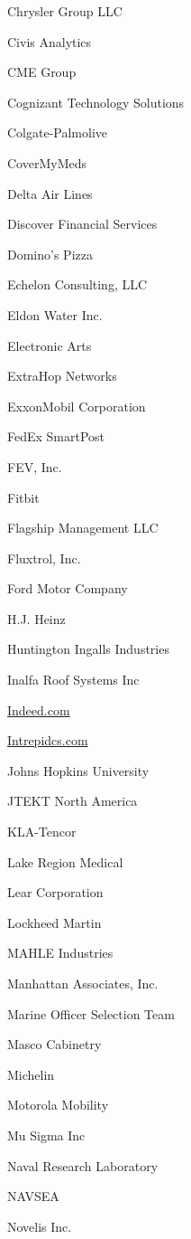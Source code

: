 \documentclass[twoside]{article}
\begin{document}
\begin{center}
\begin{multicols}{5}
\begin{FlushLeft}
\begin{compactitem}
\item Chrysler Group LLC
\item Civis Analytics
\item CME Group
\item Cognizant Technology Solutions
\item Colgate-Palmolive
\item CoverMyMeds
\item Delta Air Lines
\item Discover Financial Services
\item Domino's Pizza
\item Echelon Consulting, LLC
\item Eldon Water Inc.
\item Electronic Arts
\item ExtraHop Networks
\item ExxonMobil Corporation
\item FedEx SmartPost
\item FEV, Inc.
\item Fitbit
\item Flagship Management LLC
\item Fluxtrol, Inc.
\item Ford Motor Company
\item H.J. Heinz
\item Huntington Ingalls Industries
\item Inalfa Roof Systems Inc
\item \url{Indeed.com}
\item \url{Intrepidcs.com}
\item Johns Hopkins University
\item JTEKT North America
\item KLA-Tencor
\item Lake Region Medical
\item Lear Corporation
\item Lockheed Martin
\item MAHLE Industries
\item Manhattan Associates, Inc.
\item Marine Officer Selection Team
\item Masco Cabinetry
\item Michelin
\item Motorola Mobility
\item Mu Sigma Inc
\item Naval Research Laboratory
\item NAVSEA
\item Novelis Inc.

\end{compactitem}
\end{FlushLeft}
\end{multicols}
\end{center}
\end{document}
